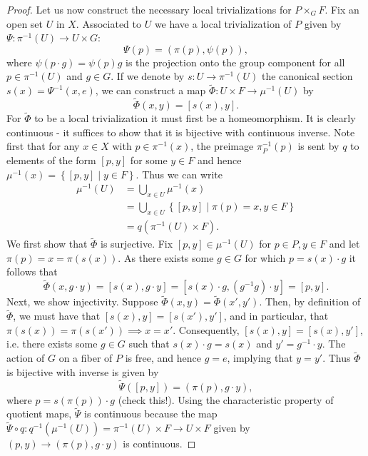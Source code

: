 \begin{proof}
    Let us now construct the necessary local trivializations for $P\times_G F$.
    Fix an open set $U$ in $X$. Associated to $U$ we have a local trivialization of $P$
    given by $\Psi:\pi^{-1}(U)\to U\times G$:
    \[\Psi(p)=(\pi(p),\psi(p)),\]
    where $\psi(p\cdot g)=\psi(p)g$ is the projection onto the group component for all $p\in\pi^{-1}(U)$ and $g\in G$.
    If we denote by $s:U\to\pi^{-1}(U)$ the canonical section $s(x)=\Psi^{-1}(x,e)$, we can construct a map
    $\tilde\Phi:U\times F\to\mu^{-1}(U)$ by
    \[\tilde\Phi(x,y)=[s(x),y].\]
    For $\tilde\Phi$ to be a local trivialization it must first be a homeomorphism. It is clearly continuous - it
    suffices to show that it is bijective with continuous inverse.
    Note first that for any $x\in X$ with $p\in\pi^{-1}(x)$,
    the preimage $\pi_P^{-1}(p)$ is sent by $q$ to elements of the form $[p,y]$ for some $y\in F$ and hence
    $\mu^{-1}(x)=\left\{ [p,y]\mid y\in F \right\}$. 
    Thus we can write
    \begin{align*}
        \mu^{-1}(U)&=\bigcup_{x\in U}\mu^{-1}(x)\\
        &=\bigcup_{x\in U}\left\{ [p,y]\mid \pi(p)=x,y\in F \right\}\\
        &=q(\pi^{-1}(U)\times F).
    \end{align*}
    We first show that $\tilde\Phi$ is surjective. Fix $[p,y]\in \mu^{-1}(U)$ for $p\in P, y\in F$
    and let $\pi(p)=x=\pi(s(x))$. As there exists some $g\in G$ for which $p=s(x)\cdot g$ it follows that
    \[\tilde\Phi(x,g\cdot y)=[s(x),g\cdot y]=[s(x)\cdot g,(g^{-1}g)\cdot y]=[p,y].\]
    Next, we show injectivity. Suppose $\tilde\Phi(x,y)=\tilde\Phi(x',y')$. Then, by definition of $\tilde\Phi$,
    we must have that $[s(x),y]=[s(x'),y']$, and in particular, that $\pi(s(x))=\pi(s(x'))\implies x=x'$.
    Consequently, $[s(x),y]=[s(x),y']$, i.e. there exists some $g\in G$ such that $s(x)\cdot g=s(x)$
    and $y'=g^{-1}\cdot y$. The action of $G$ on a fiber of $P$ is free, and hence $g=e$, implying that
    $y=y'$. Thus $\tilde\Phi$ is bijective with inverse is given by
    \[\tilde\Psi([p,y])=(\pi(p), g\cdot y),\]
    where $p=s(\pi(p))\cdot g$ (check this!). Using the characteristic property of quotient maps, $\tilde\Psi$
    is continuous because the map $\tilde\Psi\circ q:q^{-1}(\mu^{-1}(U))=\pi^{-1}(U)\times F\to U\times F$ given
    by $(p,y)\to(\pi(p),g\cdot y)$ is continuous.


\end{proof}
